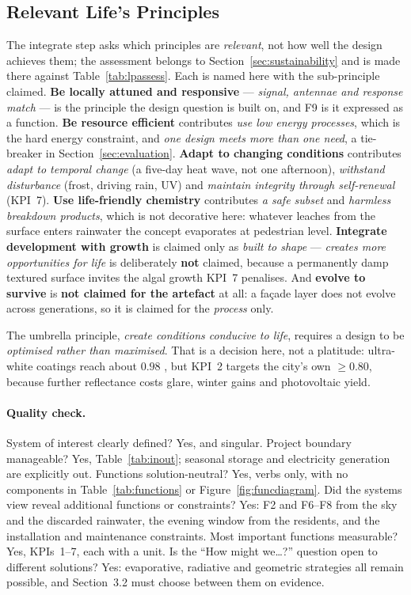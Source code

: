 \subsection{Relevant Life's Principles}
\label{sec:lifesprinciples}

The integrate step asks which principles are \emph{relevant}, not how well the
design achieves them; the assessment belongs to
Section~\ref{sec:sustainability} and is made there against
Table~\ref{tab:lpassess}. Each is named here with the sub-principle claimed.
\textbf{Be locally attuned and responsive} --- \emph{signal, antennae and
response match} --- is the principle the design question is built on, and F9 is
it expressed as a function. \textbf{Be resource efficient} contributes
\emph{use low energy processes}, which is the hard energy constraint, and
\emph{one design meets more than one need}, a tie-breaker in
Section~\ref{sec:evaluation}. \textbf{Adapt to changing conditions} contributes
\emph{adapt to temporal change} (a five-day heat wave, not one afternoon),
\emph{withstand disturbance} (frost, driving rain, UV) and \emph{maintain
integrity through self-renewal} (KPI~7). \textbf{Use life-friendly chemistry}
contributes \emph{a safe subset} and \emph{harmless breakdown products}, which
is not decorative here: whatever leaches from the surface enters rainwater the
concept evaporates at pedestrian level. \textbf{Integrate development with
growth} is claimed only as \emph{built to shape} --- \emph{creates more
opportunities for life} is deliberately \textbf{not} claimed, because a
permanently damp textured surface invites the algal growth KPI~7 penalises. And
\textbf{evolve to survive} is \textbf{not claimed for the artefact} at all: a
façade layer does not evolve across generations, so it is claimed for the
\emph{process} only.

The umbrella principle, \emph{create conditions conducive to life}, requires a
design to be \emph{optimised rather than maximised}. That is a decision here,
not a platitude: ultra-white coatings reach about $0.98$ \parencite{li2021}, but
KPI~2 targets the city's own $\geq0.80$, because further reflectance costs
glare, winter gains and photovoltaic yield.

\paragraph{Quality check.} System of interest clearly defined? Yes, and
singular. Project boundary manageable? Yes, Table~\ref{tab:inout}; seasonal
storage and electricity generation are explicitly out. Functions
solution-neutral? Yes, verbs only, with no components in
Table~\ref{tab:functions} or Figure~\ref{fig:funcdiagram}. Did the systems view
reveal additional functions or constraints? Yes: F2 and F6--F8 from the sky and
the discarded rainwater, the evening window from the residents, and the
installation and maintenance constraints. Most important functions measurable?
Yes, KPIs~1--7, each with a unit. Is the \enquote{How might we\ldots?} question
open to different solutions? Yes: evaporative, radiative and geometric
strategies all remain possible, and Section~3.2 must choose between them on
evidence.
